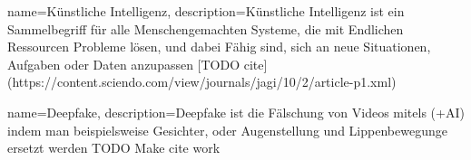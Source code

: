 {
    name={Künstliche Intelligenz},
    description={Künstliche Intelligenz ist ein Sammelbegriff für alle Menschengemachten Systeme, die mit Endlichen Ressourcen Probleme lösen, und dabei Fähig sind, sich an neue Situationen, Aufgaben oder Daten anzupassen [TODO cite](https://content.sciendo.com/view/journals/jagi/10/2/article-p1.xml)}
}

{
  name={Deepfake},
  description={Deepfake ist die Fälschung von Videos mitels (+AI) indem man beispielsweise Gesichter, oder Augenstellung und Lippenbewegunge ersetzt werden TODO Make cite work\cite{computerVisionConference}}
}

